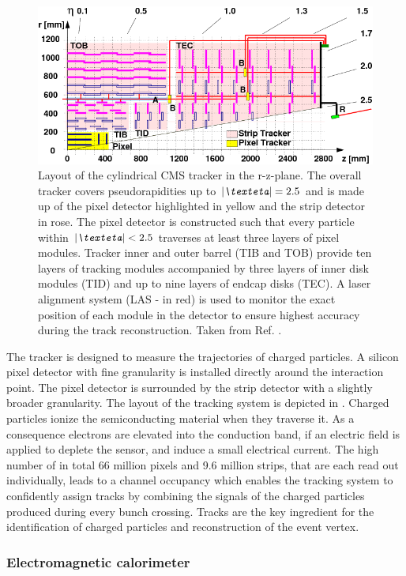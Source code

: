 \begin{figure}[h]
    \centering
    \includegraphics[width=.8\textwidth]{Figures/setup/tracker}
    \caption[CMS tracker layout.]{Layout of the cylindrical CMS tracker in the $\text{r-z}$-plane. The overall tracker covers pseudorapidities up to $\abs{\eta}=\text{2.5}$ and is made up of the pixel detector highlighted in yellow and the 
    strip detector in rose. The pixel detector is constructed such that every particle within $\abs{\eta}<\text{2.5}$ traverses at least three layers of pixel modules.
    Tracker inner and outer barrel (TIB and TOB) provide ten layers of tracking modules accompanied by three layers of inner disk modules (TID) and up to nine layers of endcap disks (TEC).
    A laser alignment system (LAS - in red) is used to monitor the exact position of each module in the detector to ensure highest accuracy during the track reconstruction. Taken from Ref. \cite{Chatrchyan:1211825}.}\label{CMS:tracker}
\end{figure}
The tracker is designed to measure the trajectories of charged particles. 
A silicon pixel detector with fine granularity is installed directly around the interaction point. The 
pixel detector is surrounded by the strip detector with a slightly broader granularity. 
The layout of the tracking system is depicted in .
Charged particles ionize the semiconducting material when they traverse it. As a consequence electrons are elevated into the
conduction band, if an electric field is applied to deplete the sensor, and induce a small electrical current.
The high number of in total 66 million pixels and 9.6 million strips, that are each read out individually, leads to a channel occupancy which enables the tracking
system to confidently assign tracks by combining the signals of the charged particles produced during every bunch crossing. 
Tracks are the key ingredient for the identification of charged particles and reconstruction of the event vertex.

\subsubsection{Electromagnetic calorimeter}

